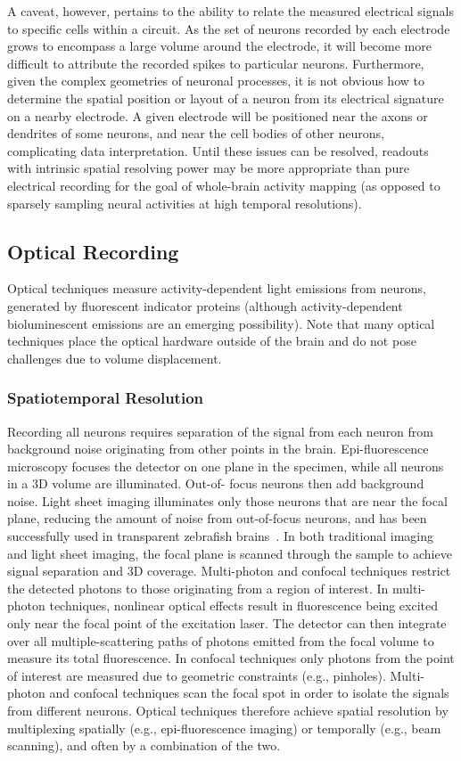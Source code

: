A caveat, however, pertains to the ability to relate the measured electrical signals to specific cells within a circuit.
As the set of neurons recorded by each electrode grows to encompass a large volume around the electrode, it will become more difficult to attribute the recorded spikes to particular neurons.
Furthermore, given the complex geometries of neuronal processes, it is not obvious how to determine the spatial position or layout of a neuron from its electrical signature on a nearby electrode.
A given electrode will be positioned near the axons or dendrites of some neurons, and near the cell bodies of other neurons, complicating data interpretation.
Until these issues can be resolved, readouts with intrinsic spatial resolving power may be more appropriate than pure electrical recording for the goal of whole-brain activity mapping (as opposed to sparsely sampling neural activities at high temporal resolutions).

\subsection{Optical Recording}

Optical techniques measure activity-dependent light emissions from neurons, generated by fluorescent indicator proteins (although activity-dependent bioluminescent emissions are an emerging possibility).
Note that many optical techniques place the optical hardware outside of the brain and do not pose challenges due to volume displacement.

\subsubsection{Spatiotemporal Resolution}

Recording all neurons requires separation of the signal from each neuron from background noise originating from other points in the brain.
Epi-fluorescence microscopy focuses the detector on one plane in the specimen, while all neurons in a 3D volume are illuminated.
Out-of- focus neurons then add background noise.
Light sheet imaging illuminates only those neurons that are near the focal plane, reducing the amount of noise from out-of-focus neurons, and has been successfully used in transparent zebrafish brains~\cite{ahrens13}.
In both traditional imaging and light sheet imaging, the focal plane is scanned through the sample to achieve signal separation and 3D coverage.
Multi-photon and confocal techniques restrict the detected photons to those originating from a region of interest.
In multi-photon techniques, nonlinear optical effects result in fluorescence being excited only near the focal point of the excitation laser.
The detector can then integrate over all multiple-scattering paths of photons emitted from the focal volume to measure its total fluorescence.
In confocal techniques only photons from the point of interest are measured due to geometric constraints (e.g., pinholes).
Multi-photon and confocal techniques scan the focal spot in order to isolate the signals from different neurons.
Optical techniques therefore achieve spatial resolution by multiplexing spatially (e.g., epi-fluorescence imaging) or temporally (e.g., beam scanning), and often by a combination of the two.

